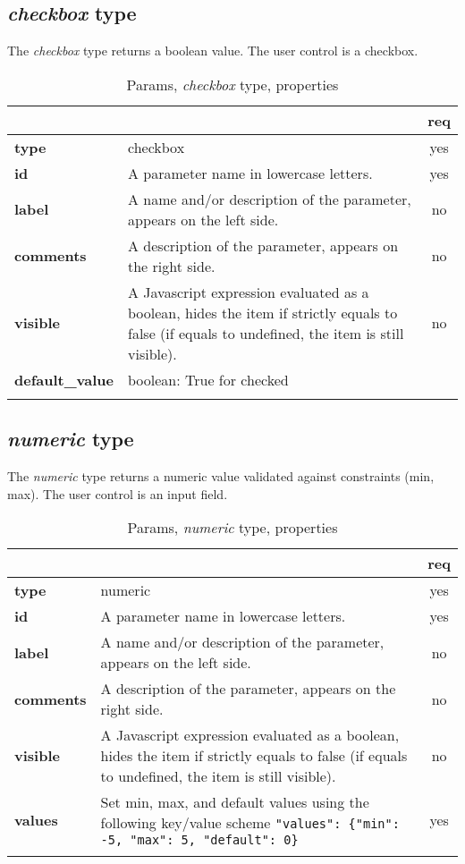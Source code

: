 \subsection{ \emph{checkbox} type}

The \emph{checkbox} type returns a boolean value. The user control is a checkbox.


\begin{longtable}{|>{\bf}L{\linewidth}|L{\linewidth}|c|}
\hline
      &  & {\bf req} 
\tabularnewline \hline \hline
 type  & checkbox  & yes \\ \hline
 id     & A parameter name in lowercase letters. & yes \\ \hline
 label  & A name and/or description of the parameter, appears on the left side. & no
                      \\ \hline
 comments & A description of the parameter, appears on the right side. & no
                      \\ \hline
 visible    & A Javascript expression evaluated as a boolean, hides the item if
              strictly equals to false (if equals to undefined, the item is still visible). 
            & no \\ \hline
 default\_value & boolean: True for checked & \\ \hline
\caption{Params, \emph{checkbox} type, properties}
\end{longtable}

\subsection{ \emph{numeric} type}

The \emph{numeric} type returns a numeric value validated against constraints (min, max). The user control is an input field.

\begin{longtable}{|>{\bf}L{\linewidth}|L{\linewidth}|c|}
\hline
      &  & {\bf req} 
\tabularnewline \hline \hline
 type       & numeric   & yes \\ \hline
 id     & A parameter name in lowercase letters. & yes \\ \hline
 label  & A name and/or description of the parameter, appears on the left side. & no
                      \\ \hline
 comments & A description of the parameter, appears on the right side. & no
                      \\ \hline
 visible    & A Javascript expression evaluated as a boolean, hides the item if
              strictly equals to false (if equals to undefined, the item is still visible). 
            & no \\ \hline
 values     & Set min, max, and default values using the following key/value scheme \texttt{"values": \{"min": -5, "max": 5, "default": 0\}} & yes \\ \hline
\caption{Params, \emph{numeric} type, properties}
\end{longtable}

